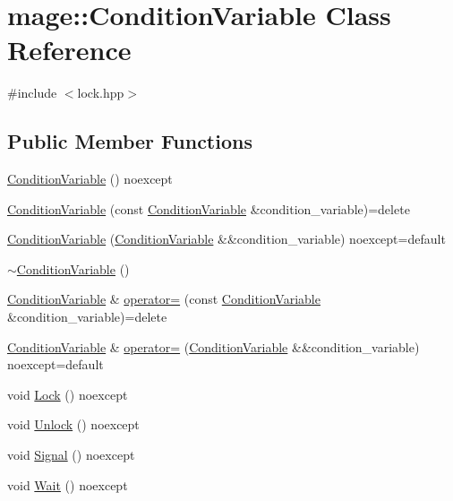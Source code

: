 \hypertarget{classmage_1_1_condition_variable}{}\section{mage\+:\+:Condition\+Variable Class Reference}
\label{classmage_1_1_condition_variable}


{\ttfamily \#include $<$lock.\+hpp$>$}

\subsection*{Public Member Functions}
\begin{DoxyCompactItemize}
\item 
\hyperlink{classmage_1_1_condition_variable_ad4090aa7c9fa24483da84ee87f8196fa}{Condition\+Variable} () noexcept
\item 
\hyperlink{classmage_1_1_condition_variable_add5ccf5807a94588c28621141df334d3}{Condition\+Variable} (const \hyperlink{classmage_1_1_condition_variable}{Condition\+Variable} \&condition\+\_\+variable)=delete
\item 
\hyperlink{classmage_1_1_condition_variable_af9e62cadb0e6bc1c6473ffb1552bd6b2}{Condition\+Variable} (\hyperlink{classmage_1_1_condition_variable}{Condition\+Variable} \&\&condition\+\_\+variable) noexcept=default
\item 
\hyperlink{classmage_1_1_condition_variable_accd5253beb65b2904428afdb889cf00b}{$\sim$\+Condition\+Variable} ()
\item 
\hyperlink{classmage_1_1_condition_variable}{Condition\+Variable} \& \hyperlink{classmage_1_1_condition_variable_ac83eae5353cd004ee06fe2376e5bdbf4}{operator=} (const \hyperlink{classmage_1_1_condition_variable}{Condition\+Variable} \&condition\+\_\+variable)=delete
\item 
\hyperlink{classmage_1_1_condition_variable}{Condition\+Variable} \& \hyperlink{classmage_1_1_condition_variable_a7603006142e843daeee03751fb59249a}{operator=} (\hyperlink{classmage_1_1_condition_variable}{Condition\+Variable} \&\&condition\+\_\+variable) noexcept=default
\item 
void \hyperlink{classmage_1_1_condition_variable_aab712c41e76c444606d5419a20d87b7a}{Lock} () noexcept
\item 
void \hyperlink{classmage_1_1_condition_variable_a40e853cf65b0c3cb3788d2b8a45448af}{Unlock} () noexcept
\item 
void \hyperlink{classmage_1_1_condition_variable_ad48673a4f7ea2a28c7ddc77222e5d8cc}{Signal} () noexcept
\item 
void \hyperlink{classmage_1_1_condition_variable_a15a1d797032d178c787a385d11522efb}{Wait} () noexcept
\end{DoxyCompactItemize}
